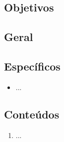 \documentclass[
	article,			%
	12pt,				%
	twoside,			%
	a4paper,			%
	english,			%
	brazil,				%
	sumario=tradicional
]{abntex2-modelo-plano-de-aula}
\begin{document}

\frenchspacing 



\imprimirletterUFSC





\textual
\pagestyle{notasUFSC}



\begin{snugshade}
	\section{Objetivos} %
\end{snugshade}

\subsection{Geral} %


\subsection{Específicos} %

\begin{itemize}
	
	\item ...
	
\end{itemize}

\newpage

\begin{snugshade}
	\section{Conteúdos} %
\end{snugshade}

\begin{enumerate}
	\item ...
\end{enumerate}
\end{document}
